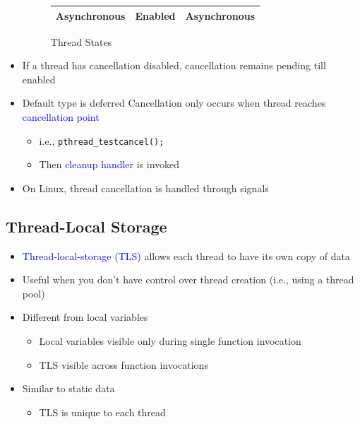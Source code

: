 \documentclass{book/custombook}
\begin{document}
\begin{itemize}
\begin{figure}[H]
\begin{tabular}{|c|c|c|}
                                \hline
                                Asynchronous & Enabled & Asynchronous\\
                                \hline
                            \end{tabular}
                            \caption{Thread States}
                        \end{figure}
                    \item If a thread has cancellation disabled, cancellation remains pending till enabled
                    \item Default type is deferred
                        \subitem Cancellation only occurs when thread reaches \textcolor{blue}{cancellation point}
                            \begin{itemize}
                                \item i.e., \texttt{pthread_testcancel();}
                                \item Then \textcolor{blue}{cleanup handler} is invoked
                            \end{itemize}
                    \item On Linux, thread cancellation is handled through signals
                \end{itemize}
            \subsection{Thread-Local Storage}
                \begin{itemize}
                    \item \textcolor{blue}{Thread-local-storage (TLS)} allows each thread to have its own copy of data
                    \item Useful when you don't have control over thread creation (i.e., using a thread pool)
                    \item Different from local variables
                        \begin{itemize}
                            \item Local variables visible only during single function invocation
                            \item TLS visible across function invocations
                        \end{itemize}
                    \item Similar to static data
                        \begin{itemize}
                            \item TLS is unique to each thread
                        \end{itemize}
                \end{itemize}
\end{document}
